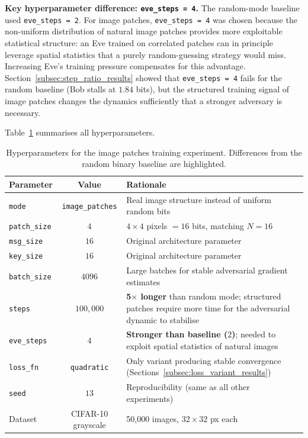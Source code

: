 \documentclass[12pt, a4paper]{article}
\newcommand{\code}[1]{\texttt{\color{CodeRed}#1}}
\begin{document}
\textbf{Key hyperparameter difference: \code{eve\_steps = 4}.}
The random-mode baseline used \code{eve\_steps = 2}.
For image patches, \code{eve\_steps = 4} was chosen because the
non-uniform distribution of natural image patches provides more exploitable
statistical structure: an Eve trained on correlated patches can in principle
leverage spatial statistics that a purely random-guessing strategy would miss.
Increasing Eve's training pressure compensates for this advantage.
Section~\ref{subsec:step_ratio_results} showed that \code{eve\_steps = 4}
fails for the random baseline (Bob stalls at $1.84$ bits), but the
structured training signal of image patches changes the dynamics sufficiently
that a stronger adversary is necessary.

Table~\ref{tab:image_patches_params} summarises all hyperparameters.

\begin{table}[H]
	\centering
	\caption{Hyperparameters for the image patches training experiment.
		Differences from the random binary baseline are highlighted.}
	\label{tab:image_patches_params}
	\renewcommand{\arraystretch}{1.35}
	\begin{tabularx}{\linewidth}{@{} l c X @{}}
		\toprule
		\textbf{Parameter} & \textbf{Value} & \textbf{Rationale} \\
		\midrule
		\code{mode}       & \code{image\_patches} &
		Real image structure instead of uniform random bits \\
		\code{patch\_size}& $4$  &
		$4 \times 4$ pixels $= 16$ bits, matching $N = 16$ \\
		\code{msg\_size}  & $16$ &
		Original architecture parameter \\
		\code{key\_size}  & $16$ &
		Original architecture parameter \\
		\code{batch\_size}& $4096$ &
		Large batches for stable adversarial gradient estimates \\
		\code{steps}      & $100{,}000$ &
		\textbf{5$\times$ longer} than random mode; structured patches
		require more time for the adversarial dynamic to stabilise \\
		\code{eve\_steps} & $4$ &
		\textbf{Stronger than baseline ($2$)}; needed to exploit
		spatial statistics of natural images \\
		\code{loss\_fn}   & \code{quadratic} &
		Only variant producing stable convergence (Sections~\ref{subsec:loss_variant_results}) \\
		\code{seed}       & $13$ &
		Reproducibility (same as all other experiments) \\
		Dataset & CIFAR-10 grayscale & 50{,}000 images, $32 \times 32$ px each \\
		\bottomrule
	\end{tabularx}
\end{table}
\end{document}
